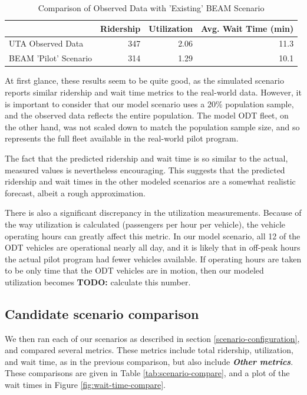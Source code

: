 \documentclass[
]{article}
\begin{document}
\begin{table}

\caption{\label{tab:existing-comparison}Comparison of Observed Data with 'Existing' BEAM Scenario}
\centering
\begin{tabular}[t]{lrrr}
\toprule
  & Ridership & Utilization & Avg. Wait Time (min)\\
\midrule
UTA Observed Data & 347 & 2.06 & 11.3\\
BEAM 'Pilot' Scenario & 314 & 1.29 & 10.1\\
\bottomrule
\end{tabular}
\end{table}

At first glance, these results seem to be quite good, as the simulated scenario reports similar ridership and wait time metrics to the real-world data. However, it is important to consider that our model scenario uses a 20\% population sample, and the observed data reflects the entire population. The model ODT fleet, on the other hand, was not scaled down to match the population sample size, and so represents the full fleet available in the real-world pilot program.

The fact that the predicted ridership and wait time is so similar to the actual, measured values is nevertheless encouraging. This suggests that the predicted ridership and wait times in the other modeled scenarios are a somewhat realistic forecast, albeit a rough approximation.

There is also a significant discrepancy in the utilization measurements. Because of the way utilization is calculated (passengers per hour per vehicle), the vehicle operating hours can greatly affect this metric. In our model scenario, all 12 of the ODT vehicles are operational nearly all day, and it is likely that in off-peak hours the actual pilot program had fewer vehicles available. If operating hours are taken to be only time that the ODT vehicles are in motion, then our modeled utilization becomes \textbf{TODO:} calculate this number.

\hypertarget{candidate-scenario-comparison}{%
\subsection{Candidate scenario comparison}\label{candidate-scenario-comparison}}

We then ran each of our scenarios as described in section \ref{scenario-configuration}, and compared several metrics. These metrics include total ridership, utilization, and wait time, as in the previous comparison, but also include \textbf{\emph{Other metrics}}. These comparisons are given in Table \ref{tab:scenario-compare}, and a plot of the wait times in Figure \ref{fig:wait-time-compare}.
\end{document}
